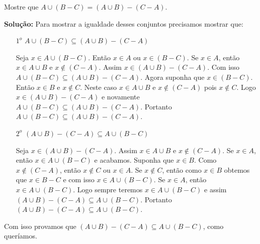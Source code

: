 \documentclass[12pt]{article}
\newcounter{exercicios}
\newcommand{\questao}{
\addtocounter{exercicios}{1}
\noindent{\bf Exerc{\'\i}cio \arabic{exercicios}: }}
\begin{document}
\vspace{.5cm}

\questao Mostre que $A \cup ( B - C) = (A \cup B) - (C - A)$.

\noindent\textbf{Solu\c{c}\~ao:} Para mostrar a igualdade desses conjuntos precisamos mostrar que:
\begin{enumerate}
	\item [$1^o$] $A \cup ( B - C) \subseteq (A \cup B) - (C - A)$

	Seja $x \in A \cup (B - C)$. Então $x \in A$ ou $x \in (B - C)$. Se $x \in A$, então $x \in A \cup B$ e $x \notin (C - A)$. Assim $x \in (A \cup B) - (C - A)$. Com isso $A \cup ( B - C) \subseteq (A \cup B) - (C - A)$. Agora suponha que $x \in (B - C)$. Então $x \in B$ e $x \notin C$. Neste caso $x \in A \cup B$ e $x \notin (C - A)$ pois $x \notin C$. Logo $x \in (A \cup B) - (C - A)$ e novamente $A \cup ( B - C) \subseteq (A \cup B) - (C - A)$. Portanto $A \cup ( B - C) \subseteq (A \cup B) - (C - A)$.

	\item [$2^o$] $(A \cup B) - (C - A) \subseteq A \cup ( B - C)$

	Seja $x \in (A \cup B) - (C - A)$. Assim $x \in A \cup B$ e $x \notin (C - A)$. Se $x \in A$, então $x \in A \cup (B - C)$ e acabamos. Suponha que $x \in B$. Como $x \notin (C - A)$, então $x \notin C$ ou $x \in A$. Se $x \notin C$, então como $x \in B$ obtemos que $x \in B - C$ e com isso $x \in A \cup (B - C)$. Se $x \in A$, então $x \in A \cup (B - C)$. Logo sempre teremos $x \in A \cup (B - C)$ e assim $(A \cup B) - (C - A) \subseteq A \cup ( B - C)$. Portanto $(A \cup B) - (C - A) \subseteq A \cup ( B - C)$.
\end{enumerate}
Com isso provamos que $(A \cup B) - (C - A) \subseteq A \cup ( B - C)$, como queríamos.
\end{document}
